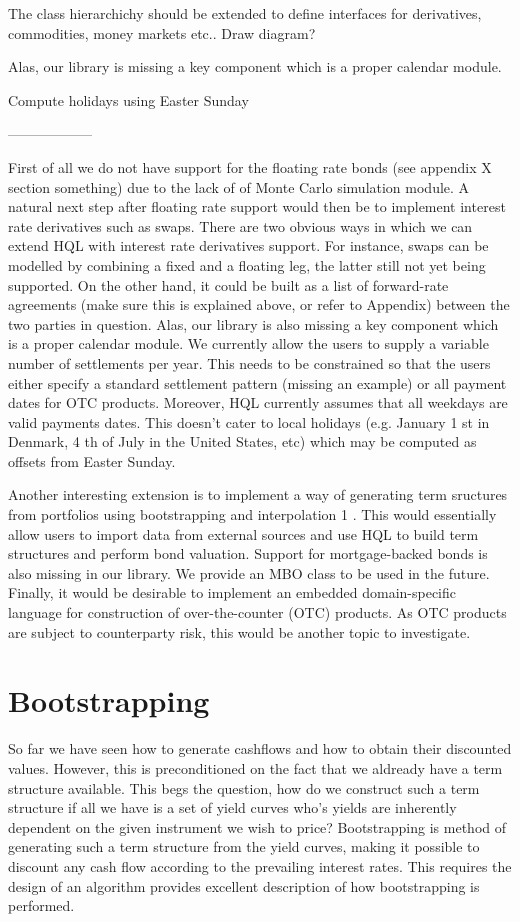 The class hierarchichy should be extended to define interfaces for derivatives, 
commodities, money markets etc.. Draw diagram?


Alas, our library is missing a key component which is a proper calendar module.


Compute holidays using Easter Sunday

------------------

First of all we do not have support for the floating rate bonds (see appendix X 
section something) due to the lack of of Monte Carlo simulation module. A 
natural next step after floating rate support would then be to implement 
interest rate derivatives such as swaps. There are two obvious ways in which we 
can extend HQL with interest rate derivatives support. For instance, swaps can 
be modelled by combining a fixed and a floating leg, the latter still not yet 
being supported. On the other hand, it could be built as a list of forward-rate 
agreements (make sure this is explained above, or refer to Appendix) between 
the two parties in question.
Alas, our library is also missing a key component which is a proper calendar 
module.
We currently allow the users to supply a variable number of settlements per 
year. This needs to be constrained so that the users either specify a standard 
settlement pattern (missing an example) or all payment dates for OTC products. 
Moreover, HQL currently assumes that all weekdays are valid payments dates. 
This doesn’t cater to local holidays (e.g. January 1 st in Denmark, 4 th of 
July in the United States, etc) which may be computed as offsets from Easter 
Sunday.

Another interesting extension is to implement a way of generating term 
sructures from portfolios using bootstrapping and interpolation 1 . This would 
essentially allow users
to import data from external sources and use HQL to build term structures and 
perform
bond valuation.
Support for mortgage-backed bonds is also missing in our library. We provide an 
MBO
class to be used in the future.
Finally, it would be desirable to implement an embedded domain-specific language
for construction of over-the-counter (OTC) products. As OTC products are 
subject to
counterparty risk, this would be another topic to investigate.

\section{Bootstrapping}

So far we have seen how to generate cashflows and how to obtain their 
discounted values. However, this is preconditioned on the fact that we aldready 
have a term structure available. This begs the question, how do we construct 
such a term structure if all we have is a set of yield curves who’s yields 
are inherently dependent on the given instrument we wish to price?
Bootstrapping is method of generating such a term structure from the yield 
curves, making it possible to discount any cash flow according to the 
prevailing interest rates.
This requires the design of an algorithm
\cite{HULL} provides excellent description of how bootstrapping is performed.
